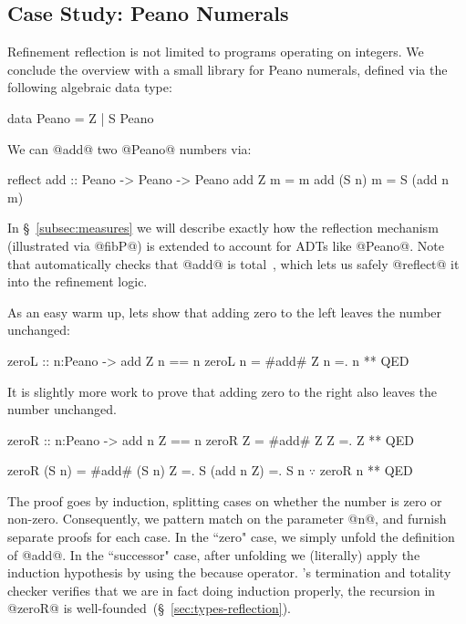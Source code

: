 \subsection{Case Study: Peano Numerals}

Refinement reflection is not limited to programs
operating on integers. We conclude the overview
with a small library for Peano numerals, defined
via the following algebraic data type:
%
\begin{code}
  data Peano = Z | S Peano
\end{code}
%
We can @add@ two @Peano@ numbers via:
%
\begin{code}
  reflect add :: Peano -> Peano -> Peano
  add Z     m = m
  add (S n) m = S (add n m)
\end{code}
%
In \S~\ref{subsec:measures} we will describe
exactly how the reflection mechanism (illustrated
via @fibP@) is extended to account for ADTs like @Peano@.
%
Note that \toolname automatically checks
that @add@ is total~\citep{Vazou14}, which
lets us safely @reflect@ it into the
refinement logic.

%
As an easy warm up, lets show that
adding zero to the left leaves the
number unchanged:
%
\begin{code}
  zeroL :: n:Peano -> { add Z n == n }
  zeroL n =  #add# Z n
          =. n
          ** QED
\end{code}

%
It is slightly more work to prove
that adding zero to the right also
leaves the number unchanged.
%
\begin{mcode}
  zeroR :: n:Peano -> { add n Z == n }
  zeroR Z     =  #add# Z Z
              =. Z
              ** QED

  zeroR (S n) =  #add# (S n) Z
              =. S (add n Z)
              =. S n         $\because$     zeroR n
              ** QED
\end{mcode}
%
The proof goes by induction, splitting cases on
whether the number is zero or non-zero. Consequently,
we pattern match on the parameter @n@, and furnish
separate proofs for each case.
%
In the ``zero" case, we simply unfold the definition
of @add@.
%
In the ``successor" case, after unfolding we (literally)
apply the induction hypothesis by using the because operator.
%
\toolname's termination and totality checker
verifies that we are in fact doing induction
properly, \ie the recursion in @zeroR@ is
well-founded~(\S~\ref{sec:types-reflection}).

